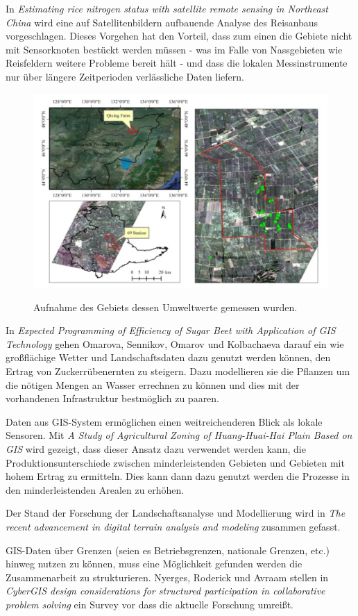 In \textit{Estimating rice nitrogen status with satellite remote sensing in Northeast China} wird eine auf Satellitenbildern aufbauende Analyse des Reisanbaus vorgeschlagen. Dieses Vorgehen hat den Vorteil, dass zum einen die Gebiete nicht mit Sensorknoten bestückt werden müssen - was im Falle von Nassgebieten wie Reisfeldern weitere Probleme bereit hält - und dass die lokalen Messinstrumente nur über längere Zeitperioden verlässliche Daten liefern.\cite{jour:Huang2013} 

\begin{figure}[h]
 \includegraphics[scale=0.4,natwidth=\textwidth]{figures/sensors/satellite_area.png}
 \centering
 \label{fig:fmishierarchy}
 \caption{Aufnahme des Gebiets dessen Umweltwerte gemessen wurden. \cite{jour:Huang2013}}
\end{figure}

In \textit{Expected Programming of Efficiency of Sugar
Beet with Application of GIS Technology} gehen Omarova, Sennikov, Omarov und Kolbachaeva darauf ein wie großflächige Wetter und Landschaftsdaten dazu genutzt werden können, den Ertrag von Zuckerrübenernten zu steigern. Dazu modellieren sie die Pflanzen um die nötigen Mengen an Wasser errechnen zu können und dies mit der vorhandenen Infrastruktur bestmöglich zu paaren.\cite{jour:Omarova2013}

Daten aus GIS-System ermöglichen einen weitreichenderen Blick als lokale Sensoren. Mit \textit{A Study of Agricultural Zoning of Huang-Huai-Hai Plain Based on GIS} wird gezeigt, dass dieser Ansatz dazu verwendet werden kann, die Produktionsunterschiede zwischen minderleistenden Gebieten und Gebieten mit hohem Ertrag zu ermitteln. Dies kann dann dazu genutzt werden die Prozesse in den minderleistenden Arealen zu erhöhen.\cite{book:Hou2013}

Der Stand der Forschung der Landschaftsanalyse und Modellierung wird in \textit{The recent advancement in digital
terrain analysis and modeling} zusammen gefasst.\cite{jour:Zhou2013}

GIS-Daten über Grenzen (seien es Betriebsgrenzen, nationale Grenzen, etc.) hinweg nutzen zu können, muss eine Möglichkeit gefunden werden die Zusammenarbeit zu strukturieren. Nyerges, Roderick und Avraam stellen in \textit{CyberGIS design considerations for structured participation in collaborative problem solving} ein Survey vor dass die aktuelle Forschung umreißt. \cite{jour:Nyerges2013}
